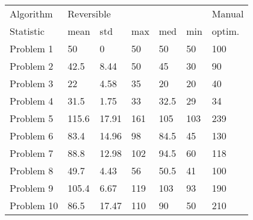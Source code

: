 \begin{tabular}{lllllll}
\toprule
Algorithm & \multicolumn{5}{l}{Reversible} & Manual \\
Statistic &       mean &    std &  max &   med &  min & optim. \\
\midrule
Problem 1  &         50 &      0 &   50 &    50 &   50 &    100 \\
Problem 2  &       42.5 &   8.44 &   50 &    45 &   30 &     90 \\
Problem 3  &         22 &   4.58 &   35 &    20 &   20 &     40 \\
Problem 4  &       31.5 &   1.75 &   33 &  32.5 &   29 &     34 \\
Problem 5  &      115.6 &  17.91 &  161 &   105 &  103 &    239 \\
Problem 6  &       83.4 &  14.96 &   98 &  84.5 &   45 &    130 \\
Problem 7  &       88.8 &  12.98 &  102 &  94.5 &   60 &    118 \\
Problem 8  &       49.7 &   4.43 &   56 &  50.5 &   41 &    100 \\
Problem 9  &      105.4 &   6.67 &  119 &   103 &   93 &    190 \\
Problem 10 &       86.5 &  17.47 &  110 &    90 &   50 &    210 \\
\bottomrule
\end{tabular}
